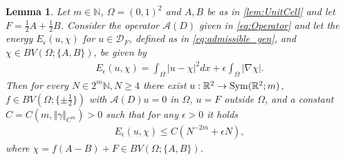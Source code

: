 \documentclass[a4paper, 10pt, twoside, notitlepage]{amsart}
\theoremstyle{plain}
\newtheorem{lem}[prop]{Lemma}
\newcommand{\R}{\mathbb{R}}
\newcommand{\N}{\mathbb{N}}
\newcommand{\A}{\mathcal{A}}
\begin{document}
		\begin{lem} \label{lem:Branching} Let $m \in \N$, $\Omega = (0,1)^2$ and $A,B$ be as in \cref{lem:UnitCell} and  let $F = \frac{1}{2}A + \frac{1}{2}B$.  Consider the
                  operator $\A(D)$ given in \cref{eq:Operator} and let the energy $E_{\epsilon}(u,\chi)$ for $u \in \mathcal{D}_{F}$, defined as in \cref{eq:admissible_gen}, and $\chi \in BV(\Omega;\{A,B\})$, be given by
                  \begin{align*}
                    E_\epsilon(u,\chi) = \int_\Omega |u-\chi|^2 dx + \epsilon \int_\Omega |\nabla \chi|.
                  \end{align*}
                  Then for every $N \in 2^m \N, N \geq 4$ there exist $u: \R^2 \to \textup{Sym}(\R^2;m)$,
			$f \in BV(\Omega;\{\pm \frac{1}{2}\})$ with $\A(D)u = 0$ in $\Omega$, $u = F$ outside $\Omega$, and a constant $C = C(m, \Vert \gamma \Vert_{C^m})>0$ such that for any $\epsilon >0$ it holds
			\begin{align*}
				E_{\epsilon}(u,\chi) \leq C(N^{-2m} + \epsilon N),
			\end{align*}
			where $\chi = f (A-B) + F \in BV(\Omega;\{A,B\})$.
		\end{lem}
		
\end{document}
